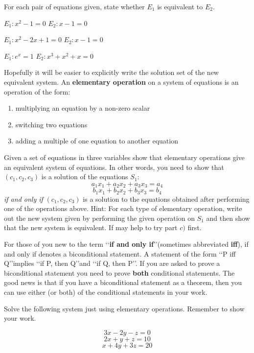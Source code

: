 \bq For each pair of equations given, state whether $E_1$ is equivalent to $E_2$.
\be
\item $E_1: x^2-1=0$ \hfill $E_2: x-1=0$
\item $E_1: x^2-2x+1=0$ \hfill $E_2: x-1=0$
\item $E_1: e^x=1$ \hfill $E_2: x^3+x^2+x=0$
\ee \eq


Hopefully it will be easier to explicitly write the solution set of the new equivalent system. An \textbf{elementary operation} on a system of equations is an operation of the form:
\begin{enumerate}
\item multiplying an equation by a non-zero scalar
\item switching two equations
\item adding a multiple of one equation to another equation
\end{enumerate}

\begin{question} Given a set of equations in three variables show that elementary operations give an equivalent system of equations. In other words, you need to show that $(c_1,c_2,c_3)$ is a solution of the equations $S_1$:
$$a_1 x_1+a_2x_2+a_3x_3=a_4$$
$$b_1 x_1+b_2x_2+b_3x_3=b_4$$
\emph{if and only if} $(c_1,c_2,c_3)$ is a solution to the equations obtained after performing one of the operations above. Hint: For each type of elementary operation, write out the new system given by performing the given operation on $S_1$ and then show that the new system is equivalent. If may help to try part $c)$ first.
\end{question}

\begin{remark}
For those of you new to the term \lq\lq \textbf{if and only if}\rq\rq (sometimes abbreviated \textbf{iff}), if and only if denotes a biconditional statement. A statement of the form \lq\lq P iff Q\rq\rq implies \lq\lq if P, then Q\rq\rq and \lq\lq if Q, then P\rq\rq. If you are asked to prove a biconditional statement you need to prove \textbf{both} conditional statements. The good news is that if you have a biconditional statement as a theorem, then you can use either (or both) of the conditional statements in your work.
\end{remark}
\begin{question}\label{q1} Solve the following system just using elementary operations. Remember to show your work.

$$3x-2y-z=0$$
$$2x+y+z=10$$
$$x+4y+3z=20$$
\end{question}

